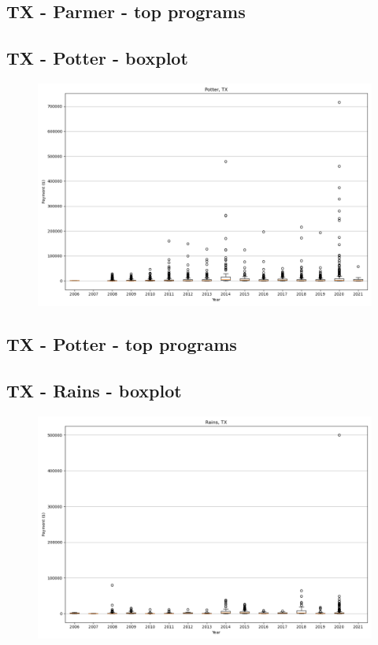\subsection*{TX - Parmer - top programs}

\newpage
\subsection*{TX - Potter - boxplot}
\begin{figure}[h]
\centering
\includegraphics[width=7in]{../output/boxplots/counties/Potter-TX_boxplot.png}
\end{figure}


\subsection*{TX - Potter - top programs}

\newpage
\subsection*{TX - Rains - boxplot}
\begin{figure}[h]
\centering
\includegraphics[width=7in]{../output/boxplots/counties/Rains-TX_boxplot.png}
\end{figure}


